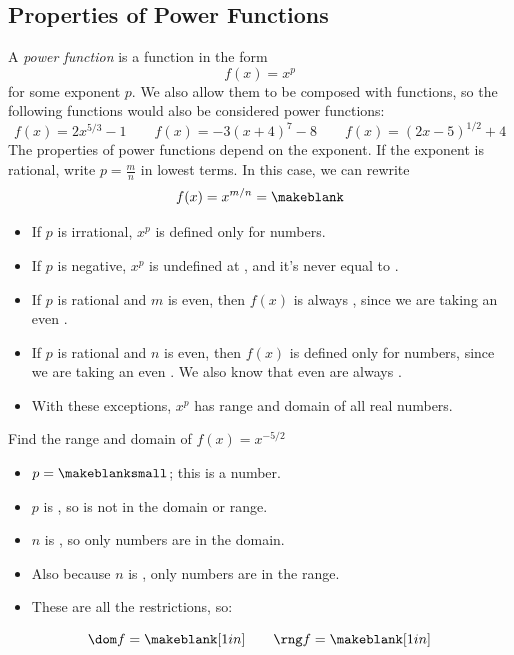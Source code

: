 \subsection{Properties of Power Functions} 
A \emph{power function} is a function in the form
\[
f(x)=x^p
\]
for some exponent $p$. We also allow them to be composed with \makeblank[1in] functions, so the following functions would also be considered power functions:
\[
f(x)=2x^{5/3}-1
\qquad
f(x)=-3(x+4)^7-8
\qquad
f(x)=(2x-5)^{1/2}+4
\]
The properties of power functions depend on the exponent. If the exponent is rational, write $p=\frac{m}{n}$ in lowest terms. In this case, we can rewrite 
$$f(x)=x^{m/n}=\makeblank$$
\begin{itemize}
\item If $p$ is irrational, $x^p$ is defined only for \makeblank[1.5in] numbers.
\item If $p$ is negative, $x^p$ is undefined at \makeblanksmall, and it's never equal to \makeblanksmall.
\item If $p$ is rational and $m$ is even, then $f(x)$ is always \makeblank[1.5in], since we are taking an even \makeblank[1in].
\item If $p$ is rational and $n$ is even, then $f(x)$ is defined only for \makeblank[1.5in] numbers, since we are taking an even \makeblank[1in]. We also know that even \makeblank[1in] are always \makeblank[1.5in]. 
\item With these exceptions, $x^p$ has range and domain of all real numbers.
\end{itemize}
\begin{example}
Find the range and domain of $f(x)=x^{-5/2}$
\begin{itemize}
\item $p=\makeblanksmall$; this is a \makeblank[1.5in] number.
\item $p$ is \makeblank[1.5in], so \makeblanksmall is not in the domain or range.
\item $n$ is \makeblank[1in], so only \makeblank[1.5in] numbers are in the domain.
\item Also because $n$ is \makeblank[1in], only \makeblank[1.5in] numbers are in the range.
\item These are all the restrictions, so:
\end{itemize}
\[
\dom f = \makeblank[1in]
\qquad
\rng f = \makeblank[1in]
\]
\end{example}